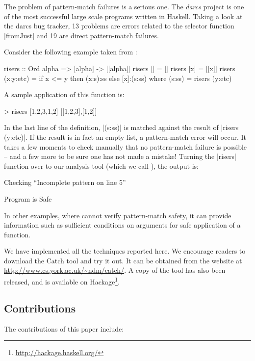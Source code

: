 The problem of pattern-match failures is a serious one. The \textit{darcs} project \citep{darcs} is one of the most successful large scale programs written in Haskell. Taking a look at the darcs bug tracker, 13 problems are errors related to the selector function |fromJust| and 19 are direct pattern-match failures.

Consider the following example taken from \citet{me:catch_tfp}:

\begin{code}
risers :: Ord alpha => [alpha] -> [[alpha]]
risers [] = []
risers [x] = [[x]]
risers (x:y:etc) = if x <= y then (x:s):ss else [x]:(s:ss)
    where (s:ss) = risers (y:etc)
\end{code}

\noindent A sample application of this function is:

\ignore\begin{code}
> risers [1,2,3,1,2]
[[1,2,3],[1,2]]
\end{code}

\noindent In the last line of the definition, |(s:ss)| is matched against the result of |risers (y:etc)|. If the result is in fact an empty list, a pattern-match error will occur. It takes a few moments to check manually that no pattern-match failure is possible -- and a few more to be sure one has not made a mistake! Turning the |risers| function over to our analysis tool (which we call \catch{}), the output is:

\smallskip
\par\noindent\textsf{Checking ``Incomplete pattern on line 5''}
\par\noindent\textsf{Program is Safe}
\smallskip

In other examples, where \catch{} cannot verify pattern-match safety, it can provide information such as sufficient conditions on arguments for safe application of a function.

We have implemented all the techniques reported here. We encourage readers to download the Catch tool and try it out. It can be obtained from the website at \url{http://www.cs.york.ac.uk/~ndm/catch/}. A copy of the tool has also been released, and is available on Hackage\footnote{\url{http://hackage.haskell.org/}}.

\subsection{Contributions}

The contributions of this paper include:

